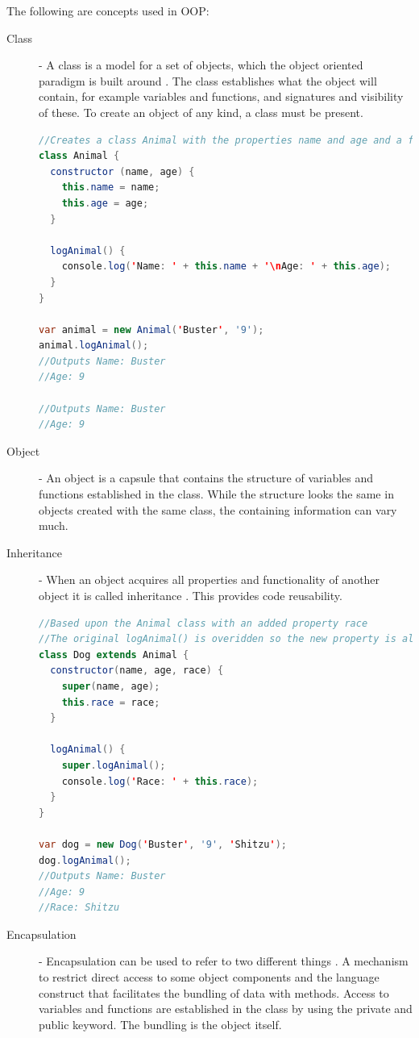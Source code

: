 \documentclass {article}
\begin{document}
The following are concepts used in OOP:
\begin{description}
\item [Class] - A class is a model for a set of objects, which the object oriented paradigm is built around \cite{gabmar}. The class establishes what the object will contain, for example variables and functions, and signatures and visibility of these. To create an object of any kind, a class must be present. 

\begin{lstlisting}[language=Java]
//Creates a class Animal with the properties name and age and a function for logging the properties to the screen
class Animal {
  constructor (name, age) {
    this.name = name;
    this.age = age;
  }

  logAnimal() {
    console.log('Name: ' + this.name + '\nAge: ' + this.age);
  }
}

var animal = new Animal('Buster', '9');
animal.logAnimal();
//Outputs Name: Buster
//Age: 9

//Outputs Name: Buster
//Age: 9
\end{lstlisting}



\item [Object] - An object is a capsule that contains the structure of variables and functions established in the class\cite{gabmar, skansholm}. While the structure looks the same in objects created with the same class, the containing information can vary much.


\item [Inheritance] - When an object acquires all properties and functionality of another object it is called inheritance \cite{skansholm}. This provides code reusability. 

\begin{lstlisting}[language=Java, breaklines=true]
//Based upon the Animal class with an added property race
//The original logAnimal() is overidden so the new property is also logged to the screen.
class Dog extends Animal {
  constructor(name, age, race) {
    super(name, age);
    this.race = race;
  }

  logAnimal() {
    super.logAnimal();
    console.log('Race: ' + this.race);
  }
}

var dog = new Dog('Buster', '9', 'Shitzu');
dog.logAnimal();
//Outputs Name: Buster
//Age: 9
//Race: Shitzu
\end{lstlisting}

\item [Encapsulation] - Encapsulation can be used to refer to two different things \cite{gabmar, skansholm}. A mechanism to restrict direct access to some object components and the language construct that facilitates the bundling of data with methods. Access to variables and functions are established in the class by using the private and public keyword. The bundling is the object itself.


\end{description}
\end{document}
